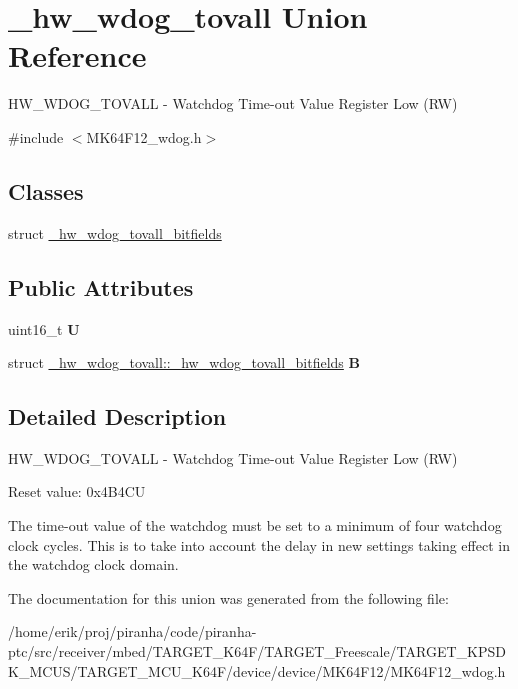 \hypertarget{union__hw__wdog__tovall}{}\section{\+\_\+hw\+\_\+wdog\+\_\+tovall Union Reference}
\label{union__hw__wdog__tovall}


H\+W\+\_\+\+W\+D\+O\+G\+\_\+\+T\+O\+V\+A\+LL -\/ Watchdog Time-\/out Value Register Low (RW)  




{\ttfamily \#include $<$M\+K64\+F12\+\_\+wdog.\+h$>$}

\subsection*{Classes}
\begin{DoxyCompactItemize}
\item 
struct \hyperlink{struct__hw__wdog__tovall_1_1__hw__wdog__tovall__bitfields}{\+\_\+hw\+\_\+wdog\+\_\+tovall\+\_\+bitfields}
\end{DoxyCompactItemize}
\subsection*{Public Attributes}
\begin{DoxyCompactItemize}
\item 
uint16\+\_\+t {\bfseries U}\hypertarget{union__hw__wdog__tovall_a6a3d3c63c06d5060f3a4806d2c6a051b}{}\label{union__hw__wdog__tovall_a6a3d3c63c06d5060f3a4806d2c6a051b}

\item 
struct \hyperlink{struct__hw__wdog__tovall_1_1__hw__wdog__tovall__bitfields}{\+\_\+hw\+\_\+wdog\+\_\+tovall\+::\+\_\+hw\+\_\+wdog\+\_\+tovall\+\_\+bitfields} {\bfseries B}\hypertarget{union__hw__wdog__tovall_ac5fbd2b0a5be615fd22f6797ba577b49}{}\label{union__hw__wdog__tovall_ac5fbd2b0a5be615fd22f6797ba577b49}

\end{DoxyCompactItemize}


\subsection{Detailed Description}
H\+W\+\_\+\+W\+D\+O\+G\+\_\+\+T\+O\+V\+A\+LL -\/ Watchdog Time-\/out Value Register Low (RW) 

Reset value\+: 0x4\+B4\+CU

The time-\/out value of the watchdog must be set to a minimum of four watchdog clock cycles. This is to take into account the delay in new settings taking effect in the watchdog clock domain. 

The documentation for this union was generated from the following file\+:\begin{DoxyCompactItemize}
\item 
/home/erik/proj/piranha/code/piranha-\/ptc/src/receiver/mbed/\+T\+A\+R\+G\+E\+T\+\_\+\+K64\+F/\+T\+A\+R\+G\+E\+T\+\_\+\+Freescale/\+T\+A\+R\+G\+E\+T\+\_\+\+K\+P\+S\+D\+K\+\_\+\+M\+C\+U\+S/\+T\+A\+R\+G\+E\+T\+\_\+\+M\+C\+U\+\_\+\+K64\+F/device/device/\+M\+K64\+F12/M\+K64\+F12\+\_\+wdog.\+h\end{DoxyCompactItemize}
